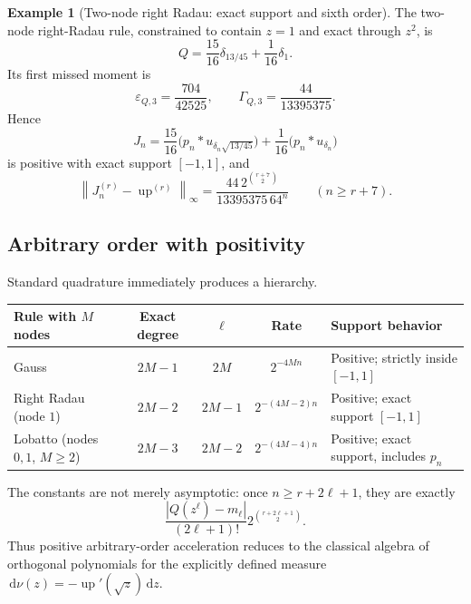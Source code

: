 \documentclass[11pt]{article}
\theoremstyle{definition}
\newtheorem{example}[theorem]{Example}
\theoremstyle{remark}
\newcommand{\Up}{\operatorname{up}}
\newcommand{\dd}{\,\mathrm d}
\newcommand{\norm}[1]{\left\lVert #1\right\rVert}
\begin{document}
\begin{example}[Two-node right Radau: exact support and sixth order]
\label{ex:radau-two}
The two-node right-Radau rule, constrained to contain $z=1$ and exact through $z^2$,
is
\begin{equation}
 Q=\frac{15}{16}\delta_{13/45}+\frac1{16}\delta_1.
 \label{eq:radau-Q}
\end{equation}
Its first missed moment is
\begin{equation}
 \varepsilon_{Q,3}=\frac{704}{42525},
 \qquad
 \Gamma_{Q,3}=\frac{44}{13395375}.
 \label{eq:radau-gamma}
\end{equation}
Hence
\begin{equation}
 J_n=\frac{15}{16}\bigl(p_n*u_{\delta_n\sqrt{13/45}}\bigr)
 +\frac1{16}\bigl(p_n*u_{\delta_n}\bigr)
 \label{eq:Jn}
\end{equation}
is positive with exact support $[-1,1]$, and
\begin{equation}
 \boxed{
 \norm{J_n^{(r)}-\Up^{(r)}}_\infty
 =\frac{44\,2^{\binom{r+7}{2}}}{13395375\,64^n}}
 \qquad(n\ge r+7).
 \label{eq:Radau-two-law}
\end{equation}
\end{example}

\subsection{Arbitrary order with positivity}

Standard quadrature immediately produces a hierarchy.

\begin{center}
\begin{tabularx}{0.96\textwidth}{@{}lcccX@{}}
\toprule
Rule with $M$ nodes & Exact degree & $\ell$ & Rate & Support behavior\\
\midrule
Gauss & $2M-1$ & $2M$ & $2^{-4Mn}$ & Positive; strictly inside $[-1,1]$\\
Right Radau (node $1$) & $2M-2$ & $2M-1$ & $2^{-(4M-2)n}$ & Positive; exact support $[-1,1]$\\
Lobatto (nodes $0,1$, $M\ge2$) & $2M-3$ & $2M-2$ & $2^{-(4M-4)n}$ & Positive; exact support, includes $p_n$\\
\bottomrule
\end{tabularx}
\end{center}

The constants are not merely asymptotic: once $n\ge r+2\ell+1$, they are exactly
\begin{equation}
 \frac{|Q(z^\ell)-m_\ell|}{(2\ell+1)!}
 2^{\binom{r+2\ell+1}{2}}.
 \label{eq:general-quadrature-constant}
\end{equation}
Thus positive arbitrary-order acceleration reduces to the classical algebra of
orthogonal polynomials for the explicitly defined measure
$\dd\nu(z)=-\Up'(\sqrt z)\dd z$.
\end{document}
